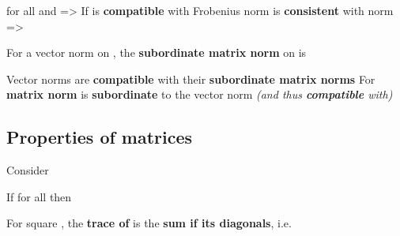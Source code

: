 \begin{itemize}
            \begin{itemize}

                  \vItem
                        for all  and
                         =>
                  \vItem
                        If  is \textbf{compatible} with
                  \vItem
                        Frobenius norm is \textbf{consistent} with  norm
                        => 
            \end{itemize}
      \vItem
            For a vector norm \iMbox{\|\cdot\|} on , the
            \textbf{subordinate matrix norm} \iMbox{\|\cdot\|} on
             is

      \vItem
            Vector norms are \textbf{compatible} with their \textbf{subordinate
                  matrix norms}
      \vItem
            For  \textbf{matrix norm}  is
            \textbf{subordinate} to the vector norm  \emph{(and
                  thus \textbf{compatible} with)}
\end{itemize}

\subsection*{Properties of matrices}

Consider 

If  for all  then 

For square , the \textbf{trace of } is the
\textbf{sum if its diagonals}, i.e. 

